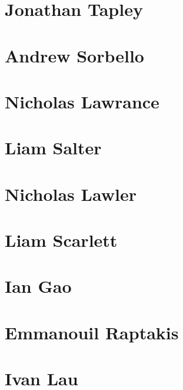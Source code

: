 \chapter{Jonathan Tapley}


\chapter{Andrew Sorbello}


\chapter{Nicholas Lawrance}


\chapter{Liam Salter}


\chapter{Nicholas Lawler}


\chapter{Liam Scarlett}


\chapter{Ian Gao}


\chapter{Emmanouil Raptakis}


\chapter{Ivan Lau}




